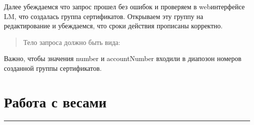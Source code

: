\documentclass[a4paper,10pt,russian]{report}
\begin{document}
\sphinxAtStartPar
Далее убеждаемся что запрос прошел без ошибок и проверяем в web\sphinxhyphen{}интерфейсе LM, что создалась группа сертификатов. Открываем эту группу на редактирование и убеждаемся, что сроки действия прописаны корректно.
\begin{quote}

\begin{figure}[htbp]
\centering

\noindent{}
\end{figure}
\end{quote}

\sphinxAtStartPar
{}
\begin{quote}

\sphinxAtStartPar
Тело запроса должно быть вида:
\begin{quote}

\begin{sphinxVerbatim}[commandchars=\\\{\}]
\end{sphinxVerbatim}
\end{quote}
\end{quote}

\sphinxAtStartPar
Важно, чтобы значения  number и  accountNumber входили в диапозон номеров созданной группы сертификатов.

\sphinxstepscope


\chapter{Работа с весами}
\label{\detokenize{scal:id1}}\label{\detokenize{scal::doc}}
\begin{figure}[htbp]
\centering

\noindent{}
\end{figure}


\bigskip\hrule\bigskip


\begin{figure}[htbp]
\centering

\noindent{}
\end{figure}
\end{document}
